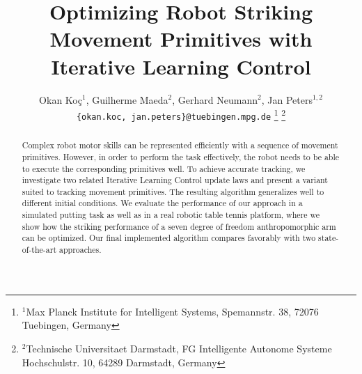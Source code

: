 \documentclass[letterpaper, 10 pt, conference]{ieeeconf}  %
\title{\LARGE \bf
Optimizing Robot Striking Movement Primitives with Iterative Learning Control
}
\author{Okan Ko\c c$^{1}$, Guilherme Maeda$^{2}$, Gerhard Neumann${^2}$, Jan Peters$^{1,2}$%
\\
{\tt\small \{okan.koc, jan.peters\}@tuebingen.mpg.de}%
\thanks{$^{1}$Max Planck Institute for Intelligent Systems,
        Spemannstr. 38, 72076 Tuebingen, Germany}
\thanks{$^{2}$Technische Universitaet Darmstadt, FG Intelligente Autonome Systeme
        Hochschulstr. 10, 64289 Darmstadt, Germany}
}
\begin{document}
\maketitle
\thispagestyle{empty}
\pagestyle{empty}

\begin{abstract}

Complex robot motor skills can be represented efficiently with a sequence of movement primitives. However, in order to perform the task effectively, the robot needs to be able to execute the corresponding primitives well. To achieve accurate tracking, we investigate two related Iterative Learning Control update laws and present a variant suited to tracking movement primitives. The resulting algorithm generalizes well to different initial conditions. We evaluate the performance of our approach in a simulated putting task as well as in a real robotic table tennis platform, where we show how the striking performance of a seven degree of freedom anthropomorphic arm can be optimized. Our final implemented algorithm compares favorably with two state-of-the-art approaches.

\end{abstract}








%
%

\end{document}
